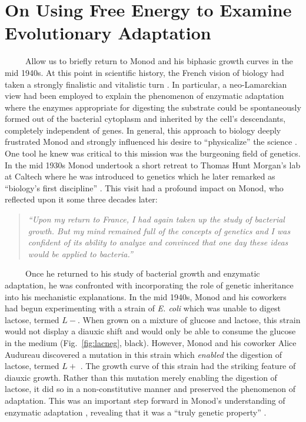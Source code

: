 \documentclass[12pt]{caltech_thesis}
\begin{document}
\hypertarget{on-using-free-energy-to-examine-evolutionary-adaptation}{%
\section{On Using Free Energy to Examine Evolutionary
Adaptation}\label{on-using-free-energy-to-examine-evolutionary-adaptation}}

~~~~~Allow us to briefly return to Monod and his biphasic growth curves
in the mid 1940s. At this point in scientific history, the French vision
of biology had taken a strongly finalistic and vitalistic turn
\autocite{loison2013}. In particular, a neo-Lamarckian view had been
employed to explain the phenomenon of enzymatic adaptation where the
enzymes appropriate for digesting the substrate could be spontaneously
formed out of the bacterial cytoplasm and inherited by the cell's
descendants, completely independent of genes. In general, this approach
to biology deeply frustrated Monod and strongly influenced his desire to
``physicalize'' the science \autocite{loison2013}. One tool he knew was
critical to this mission was the burgeoning field of genetics. In the
mid 1930s Monod undertook a short retreat to Thomas Hunt Morgan's lab at
Caltech where he was introduced to genetics which he later remarked as
``biology's first discipline'' \autocite{loison2013}. This visit had a
profound impact on Monod, who reflected upon it some three decades
later:

\begin{quote}
\emph{``Upon my return to France, I had again taken up the study of
bacterial growth. But my mind remained full of the concepts of genetics
and I was confident of its ability to analyze and convinced that one day
these ideas would be applied to bacteria.''} \autocite{monod1966}
\end{quote}

~~~~~Once he returned to his study of bacterial growth and enzymatic
adaptation, he was confronted with incorporating the role of genetic
inheritance into his mechanistic explanations. In the mid 1940s, Monod
and his coworkers had begun experimenting with a strain of \emph{E.
coli} which was unable to digest lactose, termed \(L-\). When grown on a
mixture of glucose and lactose, this strain would not display a diauxic
shift and would only be able to consume the glucose in the medium
(Fig.~\ref{fig:lacneg}, black). However, Monod and his coworker Alice
Audureau discovered a mutation in this strain which \emph{enabled} the
digestion of lactose, termed \(L+\) \autocite{monod1947}. The growth
curve of this strain had the striking feature of diauxic growth. Rather
than this mutation merely enabling the digestion of lactose, it did so
in a non-constitutive manner and preserved the phenomenon of adaptation.
This was an important step forward in Monod's understanding of enzymatic
adaptation \autocite{loison2013}, revealing that it was a ``truly
genetic property'' \autocite{monod1966}.
\end{document}
